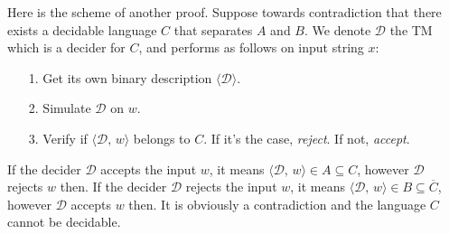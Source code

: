 \documentclass{article}
\begin{document}
Here is the scheme of another proof.
Suppose towards contradiction that there exists a decidable language $C$ that separates $A$ and $B$. We denote $\mathcal{D}$ the TM which is a decider for $C$, and performs as follows on input string $x$:
\begin{itemize}[noitemsep, topsep=0pt]
    \item [1.] Get its own binary description $\langle\mathcal{D}\rangle$.
    \item [2.] Simulate $\mathcal{D}$ on $w$.
    \item [3.] Verify if $\langle\mathcal{D},\,w\rangle$ belongs to $C$. If it's the case, \textit{reject}. If not, \textit{accept}.
\end{itemize}
If the decider $\mathcal{D}$ accepts the input $w$, it means $\langle\mathcal{D},\,w\rangle\in A \subseteq C$, however $\mathcal{D}$ rejects $w$ then. If the decider $\mathcal{D}$ rejects the input $w$, it means $\langle\mathcal{D},\,w\rangle\in B \subseteq \overline{C}$, however $\mathcal{D}$ accepts $w$ then. It is obviously a contradiction and the language $C$ cannot be decidable.

\noindent\newline [...]
\fi
\end{document}
